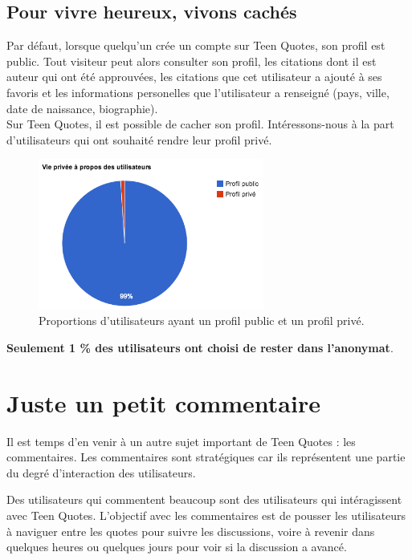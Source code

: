 \documentclass{report}
\begin{document}
	\section{Pour vivre heureux, vivons cachés}
	Par défaut, lorsque quelqu'un crée un compte sur Teen Quotes, son profil est public. Tout visiteur peut alors consulter son profil, les citations dont il est auteur qui ont été approuvées, les citations que cet utilisateur a ajouté à ses favoris et les informations personelles que l'utilisateur a renseigné (pays, ville, date de naissance, biographie).\\

	Sur Teen Quotes, il est possible de cacher son profil. Intéressons-nous à la part d'utilisateurs qui ont souhaité rendre leur profil privé.

	\begin{figure}[H]
		\center
		\includegraphics[width=280px]{images/viePriveeUtilisateurs.png}
		\caption{Proportions d'utilisateurs ayant un profil public et un profil privé.}
	\end{figure}

	\textbf{Seulement 1 \% des utilisateurs ont choisi de rester dans l'anonymat}.

	\chapter{Juste un petit commentaire}
	Il est temps d'en venir à un autre sujet important de Teen Quotes : les commentaires. Les commentaires sont stratégiques car ils représentent une partie du degré d'interaction des utilisateurs.

	Des utilisateurs qui commentent beaucoup sont des utilisateurs qui intéragissent avec Teen Quotes. L'objectif avec les commentaires est de pousser les utilisateurs à naviguer entre les quotes pour suivre les discussions, voire à revenir dans quelques heures ou quelques jours pour voir si la discussion a avancé.
\end{document}
